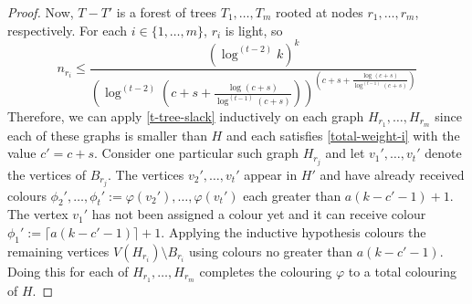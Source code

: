 \documentclass[kpfonts]{patmorin}
\theoremstyle{named}
\begin{document}
\begin{proof}
   Now, $T-T'$ is a forest of trees $T_1,\ldots,T_m$ rooted at nodes $r_1,\ldots,r_m$, respectively.
   For each $i\in\{1,\ldots,m\}$, $r_i$ is light, so
   \[
       n_{r_i} \le \frac{(\log^{(t-2)} k)^k}{
        \left(
            \log^{(t-2)}
                \left(
                   c+s+\tfrac{\log(c+s)}{\log^{(t-1)}(c+s)}
               \right)
        \right)^{\left(
           c+s+\tfrac{\log(c+s)}{\log^{(t-1)}(c+s)}
       \right)}
       }
   \]
   Therefore, we can apply \cref{t-tree-slack} inductively on each graph $H_{r_1},\ldots,H_{r_m}$ since each of these graphs is smaller than $H$ and each satisfies \cref{total-weight-i} with the value $c'=c+s$.
   Consider one particular such graph $H_{r_j}$ and let $v_1',\ldots,v_t'$ denote the vertices of $B_{r_j}$.  The vertices $v_2',\ldots,v_t'$ appear in $H'$ and have already received colours $\phi_2',\ldots,\phi_t':=\varphi(v_2'),\ldots,\varphi(v_t')$ each greater than $a(k-c'-1)+1$.  The vertex $v_1'$ has not been assigned a colour yet and it can receive colour $\phi_1':=\lceil a(k-c'-1)\rceil+1$.  Applying the inductive hypothesis colours the remaining vertices $V(H_{r_i})\setminus B_{r_i}$ using colours no greater than $a(k-c'-1)$.  Doing this for each of $H_{r_1},\ldots,H_{r_m}$ completes the colouring $\varphi$ to a total colouring of $H$.


\end{proof}
\end{document}
